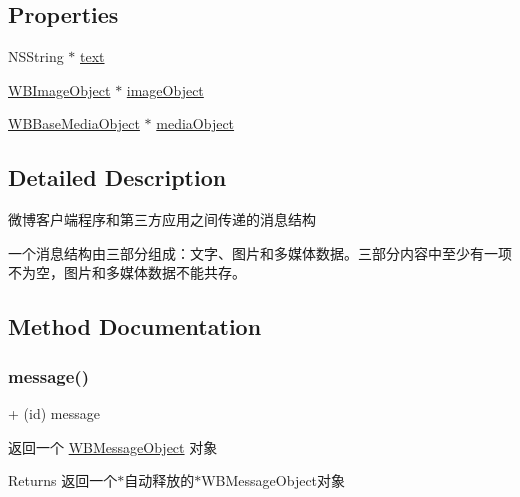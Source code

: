 \subsection*{Properties}
\begin{DoxyCompactItemize}
\item 
N\+S\+String $\ast$ \mbox{\hyperlink{interface_w_b_message_object_ac71697733c16d0f8ee135eb2c9637e10}{text}}
\item 
\mbox{\hyperlink{interface_w_b_image_object}{W\+B\+Image\+Object}} $\ast$ \mbox{\hyperlink{interface_w_b_message_object_ad24e852cfd5ecb92c900f24fd3624dba}{image\+Object}}
\item 
\mbox{\hyperlink{interface_w_b_base_media_object}{W\+B\+Base\+Media\+Object}} $\ast$ \mbox{\hyperlink{interface_w_b_message_object_af36d6cdb8586404dfcfe8cca06e750ed}{media\+Object}}
\end{DoxyCompactItemize}


\subsection{Detailed Description}
微博客户端程序和第三方应用之间传递的消息结构

一个消息结构由三部分组成：文字、图片和多媒体数据。三部分内容中至少有一项不为空，图片和多媒体数据不能共存。 

\subsection{Method Documentation}
\mbox{\label{interface_w_b_message_object_a653a30fc2b63ed605063309fdecb4d05}} 
\subsubsection{\texorpdfstring{message()}{message()}\hspace{0.1cm}{\footnotesize\ttfamily [1/3]}}
{\footnotesize\ttfamily + (id) message \begin{DoxyParamCaption}{ }\end{DoxyParamCaption}}

返回一个 \mbox{\hyperlink{interface_w_b_message_object}{W\+B\+Message\+Object}} 对象

\begin{DoxyReturn}{Returns}
返回一个$\ast$自动释放的$\ast$\+W\+B\+Message\+Object对象 
\end{DoxyReturn}
\mbox{\label{interface_w_b_message_object_a653a30fc2b63ed605063309fdecb4d05}} 
